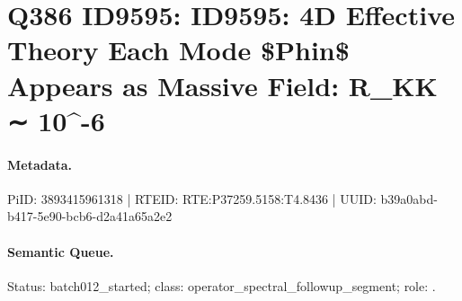 \section*{Q386 ID9595: ID9595: 4D Effective Theory Each Mode \$Phin\$ Appears as Massive Field: R\_KK ∼ 10\textasciicircum{}-6}
\paragraph{Metadata.}
PiID: 3893415961318 | RTEID: RTE:P37259.5158:T4.8436 | UUID: b39a0abd-b417-5e90-bcb6-d2a41a65a2e2

\paragraph{Semantic Queue.}
Status: batch012\_started; class: operator\_spectral\_followup\_segment; role: .

